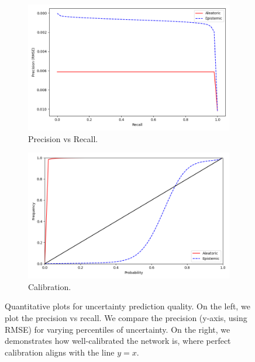 \documentclass{article}
\begin{document}
\begin{figure}
    \centering
    \begin{subfigure}{0.45\linewidth}
        \includegraphics[width=\linewidth]{img/full_pvr_2.png}
        \caption{Precision vs Recall.}
        \label{fig:pvr}
    \end{subfigure}
    \begin{subfigure}{0.45\linewidth}
        \includegraphics[width=\linewidth]{img/full_calibration_2.png}
        \caption{Calibration.}
        \label{fig:calibration}
    \end{subfigure}
    \caption{Quantitative plots for uncertainty prediction quality. On the left, we plot the precision vs recall. We compare the precision (y-axis, using RMSE) for varying percentiles of uncertainty. On the right, we demonstrates how well-calibrated the network is, where perfect calibration aligns with the line $y=x$.}
    \label{fig:uncert_anal}
\end{figure}
\end{document}
